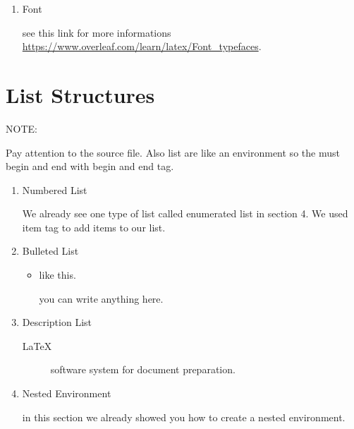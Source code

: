 \documentclass{article} %
\begin{document}
    
    \begin{enumerate}[resume]
        \item Font
        
        \qquad see this link for more informations \url{https://www.overleaf.com/learn/latex/Font_typefaces}.
        
    \end{enumerate}
    
    
\section{List Structures}

NOTE:

Pay attention to the source file. Also list are like an environment so the must begin and end with begin and end tag.

    \begin{enumerate}
        \item Numbered List

        \qquad We already see one type of list called enumerated list in section 4. We used item tag to add items to our list.
        
        \item Bulleted List
        
            \begin{itemize}
                \item like this.
                
                \qquad you can write anything here.
            \end{itemize}
            
       \item Description List
       
            \begin{description}
                
                \item[\LaTeX] software system for document preparation.
            
            \end{description}
            
        \item Nested Environment
        
            \qquad in this section we already showed you how to create a nested environment.
        
    \end{enumerate}
 
\end{document}
